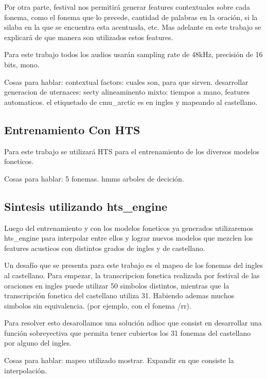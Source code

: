 Por otra parte, festival nos permitirá generar features contextuales sobre cada fonema, como el fonema que lo precede, cantidad de palabras en la oración, si la silaba en la que se encuentra esta acentuada, etc. Mas adelante en este trabajo se explicará de que manera son utilizados estos features.


Para este trabajo todos los audios usarán sampling rate de 48kHz, precisión de 16 bits, mono.


Cosas para hablar:
contextual factors: cuales son, para que sirven.
desarrollar generacion de uternaces: secty alineaminento mixto: tiempos a mano, features automaticos.
el etiquetado de cmu_arctic es en ingles y mapeando al castellano.

\subsection{Entrenamiento Con HTS}

Para este trabajo se utilizará HTS para el entrenamiento de los diversos modelos foneticos.

Cosas para hablar:
5 fonemas.
hmms
arboles de decición.

\subsection{Sintesis utilizando hts_engine}

Luego del entrenamiento y con los modelos foneticos ya generados utilizaremos hts_engine para interpolar entre ellos y lograr nuevos modelos que mezclen los features acusticos con distintos grados de ingles y de castellano.

Un desafío que se presenta para este trabajo es el mapeo de los fonemas del ingles al castellano. Para empezar, la transcripcion fonetica realizada por festival de las oraciones en ingles puede utilizar 50 simbolos distintos, mientras que la transcripción fonetica del castellano utiliza 31. Habiendo ademas muchos simbolos sin equivalencia. (por ejemplo, con el fonema /rr).

Para resolver esto desarollamos una solución adhoc que consist en desarrollar una función sobreyectiva que permita tener cubiertos los 31 fonemas del castellano por alguno del ingles.

Cosas para hablar:
mapeo utilizado mostrar.
Expandir en que consiste la interpolación.